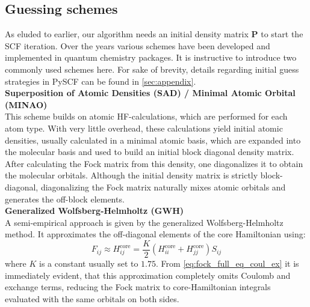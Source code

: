 \subsection{Guessing schemes}
\label{subsec:background_hf_guessing}
As eluded to earlier, our algorithm needs an initial density matrix $\mathbf{P}$ to start the SCF iteration. Over the years various schemes have been developed and implemented in quantum chemistry packages. It is instructive to introduce two commonly used schemes here. For sake of brevity, details regarding initial guess strategies in PySCF can be found in \autoref{sec:appendix}.\\

\textbf{Superposition of Atomic Densities (SAD) / Minimal Atomic Orbital (MINAO)}\\
This scheme builds on atomic HF-calculations, which are performed for each atom type. With very little overhead, these calculations yield initial atomic densities, usually calculated in a minimal atomic basis, which are expanded into the molecular basis and used to build an initial block diagonal density matrix. After calculating the Fock matrix from this density, one diagonalizes it to obtain the molecular orbitals. Although the initial density matrix is strictly block-diagonal, diagonalizing the Fock matrix naturally mixes atomic orbitals and generates the off-block elements. \parencite{ref:sad_guess}\\

\textbf{Generalized Wolfsberg-Helmholtz (GWH)}\\
A semi-empirical approach is given by the generalized Wolfsberg-Helmholtz method. It approximates the off-diagonal elements of the core Hamiltonian using: 
\begin{equation}
    \label{eq:gwh}
    F_{ij} \approx H^{\text{core}}_{ij} = \frac{K}{2}(H^{\text{core}}_{ii} + H^{\text{core}}_{jj})S_{ij}
\end{equation}
where $K$ is a constant usually set to $1.75$. From \autoref{eq:fock_full_eq_coul_ex} it is immediately evident, that this approximation completely omits Coulomb and exchange terms, reducing the Fock matrix to core-Hamiltonian integrals evaluated with the same orbitals on both sides. \parencite{ref:gwh_wolfsberg1952spectra, ref:Lehtola2019}

